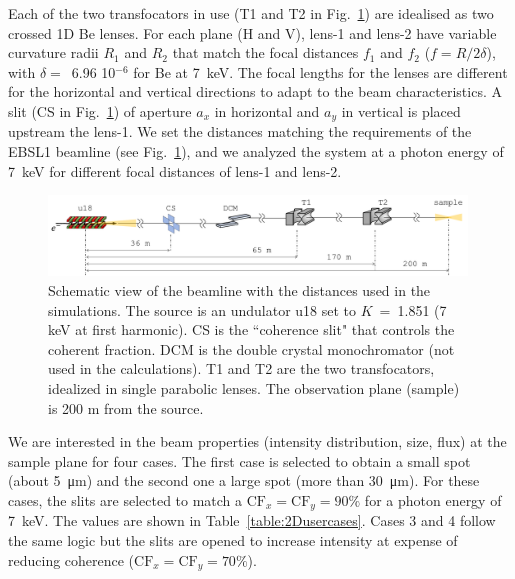 \documentclass{iucr}
\newcommand{\inblue}[1]{{\color{blue}#1}}
\newcommand{\whencolumns}[2]{#1}
\newcommand{\whencolumns}[2]{#2}
\begin{document}
Each of the two transfocators in use (T1 and T2 in \inblue{Fig.~\ref{fig:beamline}}) are idealised as two crossed 1D Be lenses. For each plane (H and V),
lens-1 and lens-2 have variable curvature radii $R_1$ and $R_2$ that match the focal distances $f_1$ and $f_2$ ($f=R/2\delta$), with $\delta=$~6.96 10$^{-6}$ for Be at \SI{7}{keV}. 
The focal lengths for the lenses are different for the horizontal and vertical directions to adapt to the beam characteristics.  
A slit (CS in \inblue{Fig.~\ref{fig:beamline}}) of aperture $a_x$ in horizontal and $a_y$ in vertical is placed upstream the lens-1. We set the distances matching the requirements of the EBSL1 beamline (see \inblue{Fig.~\ref{fig:beamline}}), and we analyzed the system at a photon energy of \SI{7}{keV} for different focal distances of lens-1 and lens-2. 
\whencolumns{}{\onecolumn}
\begin{figure}\label{fig:beamline}
    \includegraphics[width=0.99\textwidth]{figures/beamline.pdf}
    \caption{Schematic view of the beamline with the distances used in the simulations. The source is an undulator u18 set to $K$~=~1.851 (7 keV at first harmonic). CS is the ``coherence slit" that controls the coherent fraction. DCM is the double crystal monochromator (not used in the calculations). T1 and T2 are the two transfocators, idealized in single parabolic lenses. The observation plane (sample) is 200 m from the source. 
    }
\end{figure}
\whencolumns{}{\twocolumn}


We are interested in the beam properties (intensity distribution, size, flux) at the sample plane for four cases.
The first case is selected to obtain a small spot (about \SI{5}{\micro\meter}) and the second one a large spot (more than \SI{30}{\micro\meter}). For these cases, the slits are selected to match a $\text{CF}_{x}=\text{CF}_{y}=90\%$ for a photon energy of \SI{7}{keV}. The values are shown in Table~\ref{table:2Dusercases}. Cases 3 and 4 follow the same logic but the slits are opened to increase intensity at expense of reducing coherence  ($\text{CF}_{x}=\text{CF}_{y}=70\%$). 
\end{document}
